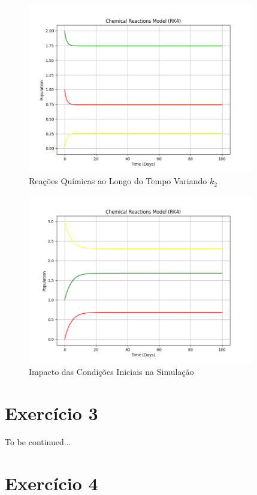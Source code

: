\documentclass[a4paper, 12pt]{article}
\begin{document}
\begin{figure}[H]
    \centering
    \includegraphics[width=0.88\textwidth]{Images/Exercise 2/k2.png}
    \caption{Reações Químicas ao Longo do Tempo Variando \(k_2\)}
    \label{fig:exampleFig8}
\end{figure}

\begin{figure}[H]
    \centering
    \includegraphics[width=0.88\textwidth]{Images/Exercise 2/ic.png}
    \caption{Impacto das Condições Iniciais na Simulação}
    \label{fig:exampleFig9}
\end{figure}

\section*{Exercício 3}

To be continued...

\section*{Exercício 4}
\end{document}
